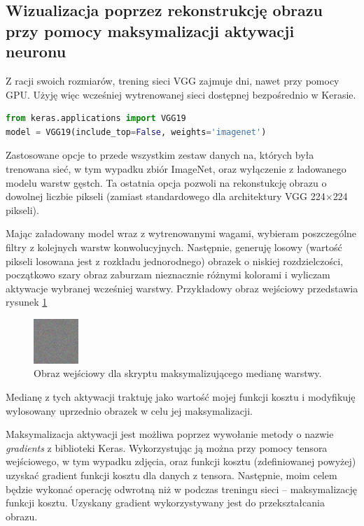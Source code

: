 \subsection{Wizualizacja poprzez rekonstrukcję obrazu przy pomocy maksymalizacji aktywacji neuronu}
\label{vgg-mean-activation}

Z racji swoich rozmiarów, trening sieci VGG zajmuje dni, nawet przy pomocy GPU. Użyję więc wcześniej wytrenowanej sieci dostępnej bezpośrednio w Kerasie.

\begin{lstlisting}[language=Python, caption={Wczytywanie wag VGG-19 w Keras.}, label={lst:vggkeras}, captionpos=b]
from keras.applications import VGG19
model = VGG19(include_top=False, weights='imagenet')
\end{lstlisting}

Zastosowane opcje to przede wszystkim zestaw danych na, których była trenowana sieć, w tym wypadku zbiór ImageNet\cite{imagenet}, oraz wyłączenie z ładowanego modelu warstw gęstch. Ta ostatnia opcja pozwoli na rekonstukcję obrazu o dowolnej liczbie pikseli (zamiast standardowego dla architektury VGG 224\(\times\)224 pikseli).

Mając załadowany model wraz z wytrenowanymi wagami, wybieram poszczególne filtry z kolejnych warstw konwolucyjnych. Następnie, generuję losowy (wartość pikseli losowana jest z rozkładu jednorodnego) obrazek o niskiej rozdzielczości, początkowo szary obraz zaburzam nieznacznie różnymi kolorami i wyliczam aktywacje wybranej wcześniej warstwy.
Przykładowy obraz wejściowy przedstawia rysunek \ref{fig:obrazwe}

\begin{figure}[ht]
\centerline{\includegraphics[scale=1]{resources/cnn/obrazwe.png}}
\caption{Obraz wejściowy dla skryptu maksymalizującego medianę warstwy.}
\label{fig:obrazwe}
\end{figure}

Medianę z tych aktywacji traktuję jako wartość mojej funkcji kosztu i modyfikuję wylosowany uprzednio obrazek w celu jej maksymalizacji.

Maksymalizacja aktywacji jest możliwa poprzez wywołanie metody o nazwie \textit{gradients} z biblioteki Keras. Wykorzystując ją można przy pomocy tensora wejściowego, w tym wypadku zdjęcia, oraz funkcji kosztu (zdefiniowanej powyżej) uzyskać gradient funkcji kosztu dla danych z tensora.
Następnie, moim celem będzie wykonać operację odwrotną niż w podczas treningu sieci -- maksymalizację funkcji kosztu. Uzyskany gradient wykorzystywany jest do przekształcania obrazu.

